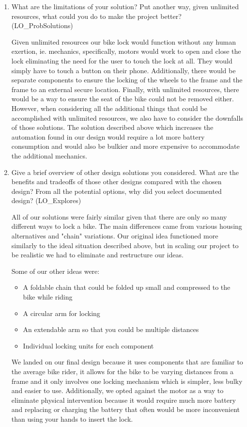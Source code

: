 \documentclass[12pt, titlepage]{article}
\begin{document}
\begin{enumerate}
  \item What are the limitations of your solution?  Put another way, given
  unlimited resources, what could you do to make the project better? (LO\_ProbSolutions)
  
  Given unlimited resources our bike lock would function without any human exertion, ie. mechanics, specifically, motors would work to open and close the lock eliminating the need for the user to touch the lock at all. They would simply have to touch a button on their phone. Additionally, there would be separate components to ensure the locking of the wheels to the frame and the frame to an external secure location.  Finally, with unlimited resources, there would be a way to ensure the seat of the bike could not be removed either. However, when considering all the additional things that could be accomplished with unlimited resources, we also have to consider the downfalls of those solutions. The solution described above which increases the automation found in our design would require a lot more battery consumption and would also be bulkier and more expensive to accommodate the additional mechanics.
  
  \item Give a brief overview of other design solutions you considered.  What
  are the benefits and tradeoffs of those other designs compared with the chosen
  design?  From all the potential options, why did you select documented design?
  (LO\_Explores)
  
  All of our solutions were fairly similar given that there are only so many different ways to lock a bike. The main differences came from various housing alternatives and "chain" variations. Our original idea functioned more similarly to the ideal situation described above, but in scaling our project to be realistic we had to eliminate and restructure our ideas.  
  
  Some of our other ideas were: 
  \begin{itemize}
\item A foldable chain that could be folded up small and compressed to the bike while riding
\item A circular arm for locking
\item An extendable arm so that you could be multiple distances
\item Individual locking units for each component
\end{itemize}

We landed on our final design because it uses components that are familiar to the average bike rider, it allows for the bike to be varying distances from a frame and it only involves one locking mechanism which is simpler, less bulky and easier to use. Additionally, we opted against the motor as a way to eliminate physical intervention because it would require much more battery and replacing or charging the battery that often would be more inconvenient than using your hands to insert the lock.


  
\end{enumerate}
\end{document}
